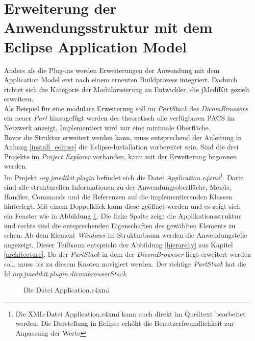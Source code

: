 \FloatBarrier
\section{Erweiterung der Anwendungsstruktur mit dem Eclipse Application Model}
Anders als die Plug-ins werden Erweiterungen der Anwendung mit dem Application Model erst nach einem erneuten Buildprozess integriert. Dadurch richtet sich die Kategorie der Modularisierung an Entwickler, die jMediKit gezielt erweitern.\\
Als Beispiel für eine modulare Erweiterung soll im \textit{PartStack} des \textit{DicomBrowsers} ein neuer \textit{Part} hinzugefügt werden der theoretisch alle verfügbaren PACS im Netzwerk anzeigt. Implementiert wird nur eine minimale Oberfläche.\\
Bevor die Struktur erweitert werden kann, muss entsprechend der Anleitung in Anhang \ref{install_eclipse} die Eclipse-Installation vorbereitet sein. Sind die drei Projekte im \textit{Project Explorer} vorhanden, kann mit der Erweiterung begonnen werden.\\
Im Projekt \textit{org.jmedikit.plugin} befindet sich die Datei \textit{Application.e4xmi}\footnote{Die XML-Datei Application.e4xmi kann auch direkt im Quelltext bearbeitet werden. Die Darstellung in Eclipse erhöht die Benutzerfreundlichkeit zur Anpassung der Werte}. Darin sind alle strukturellen Informationen zu der Anwendungsoberfläche, Menüs, Handler, Commands und die Referenzen auf die implementierenden Klassen hinterlegt. Mit einem Doppelklick kann diese geöffnet werden und es zeigt sich ein Fenster wie in Abbildung \ref{e4xmi}. Die linke Spalte zeigt die Applikationsstruktur und rechts sind die entsprechenden Eigenschaften des gewählten Elements zu sehen. Ab dem Element \textit{Windows} im Strukturbaum werden die Anwendungsteile angezeigt. Dieser Teilbaum entspricht der Abbildung \ref{hierarchy} aus Kapitel \ref{architecture}. Da der \textit{PartStack} in dem der \textit{DicomBroweser} liegt erweitert werden soll, muss bis zu diesem Knoten navigiert werden. Der richtige \textit{PartStack} hat die Id \textit{org.jmedikit.plugin.dicombrowserStack}.
\begin{figure}[H]
  \vspace{0.5cm}
  \centering
   \caption{Die Datei Application.e4xmi}
  \label{e4xmi}
  \vspace{0.5cm}
\end{figure}

